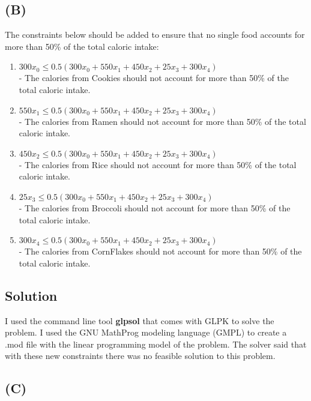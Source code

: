 \documentclass[12pt]{article}
\begin{document}
\subsection*{(B)}
The constraints below should be added to ensure that no single food accounts for more than 50\% of the total caloric intake:
\begin{enumerate}
\itemsep0em
  \item $300x_{0} \leq 0.5(300x_{0} + 550x_{1} + 450x_{2} + 25x_{3} + 300x_{4})$\\
  - The calories from Cookies should not account for more than 50\% of the total caloric intake. 
  \item $550x_{1} \leq 0.5(300x_{0} + 550x_{1} + 450x_{2} + 25x_{3} + 300x_{4})$\\
  - The calories from Ramen should not account for more than 50\% of the total caloric intake. 
  \item $450x_{2} \leq 0.5(300x_{0} + 550x_{1} + 450x_{2} + 25x_{3} + 300x_{4})$\\
  - The calories from Rice should not account for more than 50\% of the total caloric intake. 
  \item $25x_{3} \leq 0.5(300x_{0} + 550x_{1} + 450x_{2} + 25x_{3} + 300x_{4})$\\
  - The calories from Broccoli should not account for more than 50\% of the total caloric intake. 
  \item $300x_{4} \leq 0.5(300x_{0} + 550x_{1} + 450x_{2} + 25x_{3} + 300x_{4})$\\
  - The calories from CornFlakes should not account for more than 50\% of the total caloric intake.
\end{enumerate}

\subsection*{Solution}
I used the command line tool \textbf{glpsol} that comes with GLPK to solve the problem.  I used the GNU MathProg modeling language (GMPL) to create a .mod file with the linear programming model of the problem.  The solver said that with these new constraints there was no feasible solution to this problem.

\subsection*{(C)}

\newpage








\end{document}
